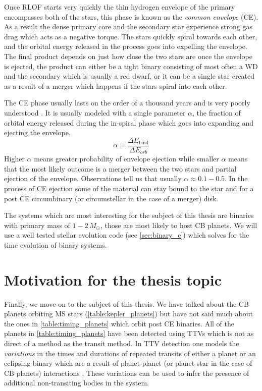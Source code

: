 \documentclass[twoside,openright,titlepage,numbers=noenddot,headinclude,%
                footinclude=true,cleardoublepage=empty,abstractoff, 
                BCOR=5mm,paper=a4,fontsize=11pt,%
                american,%
                ]{scrreprt}%
\begin{document}
Once RLOF starts very quickly the thin hydrogen envelope of the primary
encompasses both of the stars, this phase is known as the \emph{common envelope}
(CE). As a result the dense primary core and
the secondary star experience strong gas drag which acts as a negative torque.
The stars quickly spiral towards each other, and the orbital energy released
in the process goes into expelling the envelope. The final product depends
on just how close the two stars are once the envelope is ejected, the product
can either be a tight binary consisting of most often a WD and the secondary
which is usually a red dwarf, or it can be a single star created as a result
of a merger which happens if the stars spiral into each other. 

The CE phase usually lasts on the order of a thousand years and is very poorly
understood \citep{Ivanova2013}. It is usually modeled with a single parameter
$\alpha$, the fraction of orbital energy released during the in-spiral
phase which goes into expanding and ejecting the envelope. 
\begin{equation}
    \alpha= \frac{\Delta E_\text{bind}}{\Delta E_{orb}} 
\end{equation}
Higher $\alpha$ means greater probability of envelope ejection 
while smaller $\alpha$ 
means that the most likely outcome is a merger between the two stars and 
partial ejection of the envelope.
Observations tell us that usually $\alpha\approx 0.1-0.5$. In the process of CE 
ejection some of the material can stay bound to the star and for a post CE
circumbinary (or circumstellar in the case of a merger) disk. 

The systems which are most interesting for the subject of this thesis are 
binaries with primary mass of $1-2\,M_\odot$, those are most likely to host
CB planets. We will use a well tested stellar evolution code (see 
\cref{sec:binary_c}) which solves for the time evolution of binary systems.

\section{Motivation for the thesis topic}
\label{sec:two_populations}
Finally, we move on to the subject of this thesis. We have talked about the
CB planets orbiting MS stars (\cref{table:kepler_planets}) but have not said
much about the ones in \cref{table:timing_planets} which orbit post CE
binaries. All of the planets in \cref{table:timing_planets} have been detected
using TTVs which is not as direct of a method as the transit method. In TTV
detection one models the \emph{variations} in the times and durations of 
repeated transits of either a planet or an eclipsing binary which are a result
of planet-planet (or planet-star in the case of CB planets) interactions
\citep{agol2017}. These
variations can be used to infer the presence of additional non-transiting 
bodies in the system.
\end{document}
